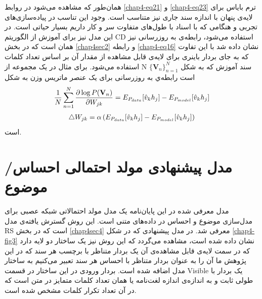 همان‌طور که مشاهده می‌‌شود در روابط
\ref{chap4-eq21}
و
\ref{chap4-eq23}
ترم بایاس برای لایه‌ی پنهان با اندازه سند جاری نیز متناسب است. وجود این تناسب در پیاده‌سازی‌های تجربی‌ و هنگامی که با اسناد با طول‌های متفاوت سر و کار داریم بسیار حیاتی است. در این مدل نیز برای آموزش از الگوریتم
CD
استفاده می‌‌شود، رابطه‌ی به روزرسانی نیز همان است که در بخش
\ref{chap4sec2}
و رابطه
\ref{chap4-eq16}
نشان داده شد با این تفاوت که به جای بردار باینری برای لایه‌ی قابل مشاهده از مقدار آن بر اساس تعداد کلمات استفاده می‌‌شود. برای مثال در یک مجموعه از
N
سند آموزش که به شکل
$\{\textbf{V}_n\}_{n=1}^{N}$
است رابطه‌ي به روزرسانی برای یک عنصر ماتریس وزن به شکل
\begin{align}
	\centering
	\label{chap4-eq24}
	\dfrac{1}{N}\sum_{n=1}^{N}\dfrac{\partial\log P(\textbf{V}_n)}{\partial W_{jk}} = E_{P_{data}}[\hat{v}_kh_j]-E_{P_{model}}[\hat{v}_kh_j]
\end{align}
\begin{align}
	\centering
	\label{chap4-eq25}
	\triangle W_{jk} = \alpha \left( E_{P_{data}}[\hat{v}_kh_j]-E_{P_{model}}[\hat{v}_kh_j]  \right)
\end{align}
است.


\section{مدل پیشنهادی مولد احتمالی احساس/موضوع}
\label{chap4sec5}



مدل معرفی‌ شده در این پایان‌‌نامه یک مدل مولد احتمالاتی شبکه عصبی برای مدل‌سازی موضوع و احساس در داده‌های متنی است. این روش گسترش یافته‌ی مدل
RS
است که در بخش
\ref{chap4sec4}
معرفی شد. در مدل پیشنهادی که در شکل
\ref{chap4-fig3}
نشان داده شده است، مشاهده می‌‌گردد که این روش نیز یک ساختار دو لایه دارد که در سمت لایه‌ی قابل مشاهده‌ی آن یک بردار متناظر با برچسب هر سند که در این پژوهش ما آن را به عنوان بردار متناظر با احساس هر سند تعبیر می‌کنیم به ساختار مدل اضافه شده است. بردار ورودی در این ساختار در قسمت
Visible
یک بردار با طولی ثابت و به اندازه‌ی اندازه لغت‌نامه یا همان تعداد کلمات متمایز در متن است که در آن تعداد تکرار کلمات مشخص شده است.

